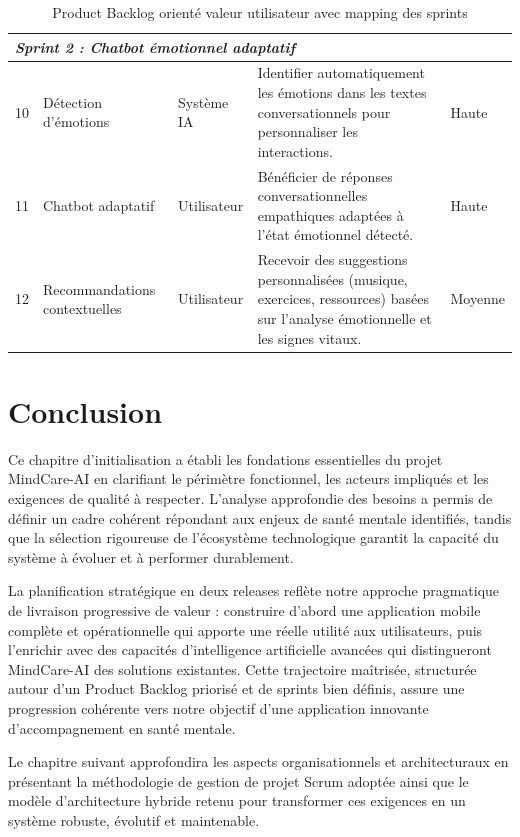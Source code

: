 \begin{table}[H]\centering
\small
\renewcommand{\arraystretch}{1.12}
\begin{tabularx}{\linewidth}{|p{0.8cm}|p{3.2cm}|p{2.3cm}|X|p{1.6cm}|}
\hline
\multicolumn{5}{|l|}{\textit{Sprint 2 : Chatbot émotionnel adaptatif}}\\
\hline
10 & Détection d'émotions & Système IA & Identifier automatiquement les émotions dans les textes conversationnels pour personnaliser les interactions. & Haute \\
\hline
11 & Chatbot adaptatif & Utilisateur & Bénéficier de réponses conversationnelles empathiques adaptées à l'état émotionnel détecté. & Haute \\
\hline
12 & Recommandations contextuelles & Utilisateur & Recevoir des suggestions personnalisées (musique, exercices, ressources) basées sur l'analyse émotionnelle et les signes vitaux. & Moyenne \\
\hline
\end{tabularx}
\caption{Product Backlog orienté valeur utilisateur avec mapping des sprints}
\end{table}

\section{Conclusion}
Ce chapitre d'initialisation a établi les fondations essentielles du projet MindCare-AI en clarifiant le périmètre fonctionnel, les acteurs impliqués et les exigences de qualité à respecter. L'analyse approfondie des besoins a permis de définir un cadre cohérent répondant aux enjeux de santé mentale identifiés, tandis que la sélection rigoureuse de l'écosystème technologique  garantit la capacité du système à évoluer et à performer durablement.

La planification stratégique en deux releases reflète notre approche pragmatique de livraison progressive de valeur : construire d'abord une application mobile complète et opérationnelle qui apporte une réelle utilité aux utilisateurs, puis l'enrichir avec des capacités d'intelligence artificielle avancées qui distingueront MindCare-AI des solutions existantes. Cette trajectoire maîtrisée, structurée autour d'un Product Backlog priorisé et de sprints bien définis, assure une progression cohérente vers notre objectif d'une application innovante d'accompagnement en santé mentale.

Le chapitre suivant approfondira les aspects organisationnels et architecturaux en présentant la méthodologie de gestion de projet Scrum adoptée ainsi que le modèle d'architecture hybride retenu pour transformer ces exigences en un système robuste, évolutif et maintenable.